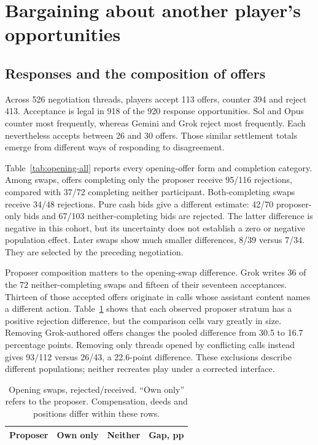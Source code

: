 \section{Bargaining about another player's opportunities}
\label{sec:bargaining}

\subsection{Responses and the composition of offers}
Across 526 negotiation threads, players accept 113 offers, counter 394 and reject 413. Acceptance is legal in 918 of the 920 response opportunities. Sol and Opus counter most frequently, whereas Gemini and Grok reject most frequently. Each nevertheless accepts between 26 and 30 offers. Those similar settlement totals emerge from different ways of responding to disagreement.

Table~\ref{tab:opening-all} reports every opening-offer form and completion category. Among swaps, offers completing only the proposer receive 95/116 rejections, compared with 37/72 completing neither participant. Both-completing swaps receive 34/48 rejections. Pure cash bids give a different estimate: 42/70 proposer-only bids and 67/103 neither-completing bids are rejected. The latter difference is negative in this cohort, but its uncertainty does not establish a zero or negative population effect. Later swaps show much smaller differences, 8/39 versus 7/34. They are selected by the preceding negotiation.



Proposer composition matters to the opening-swap difference. Grok writes 36 of the 72 neither-completing swaps and fifteen of their seventeen acceptances. Thirteen of those accepted offers originate in calls whose assistant content names a different action. Table~\ref{tab:proposer} shows that each observed proposer stratum has a positive rejection difference, but the comparison cells vary greatly in size. Removing Grok-authored offers changes the pooled difference from 30.5 to 16.7 percentage points. Removing only threads opened by conflicting calls instead gives 93/112 versus 26/43, a 22.6-point difference. These exclusions describe different populations; neither recreates play under a corrected interface.

\begin{table}[t]\centering\small
\begin{tabular}{@{}lrrr@{}}\toprule
Proposer & Own only & Neither & Gap, pp\\\midrule

\end{tabular}
\caption{Opening swaps, rejected/received. ``Own only'' refers to the proposer. Compensation, deeds and positions differ within these rows.}\label{tab:proposer}
\end{table}

